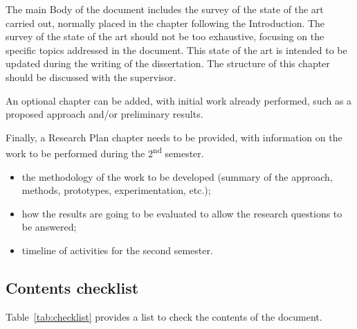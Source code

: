 The main Body of the document includes the survey of the state of the art carried out, normally placed in the chapter following the Introduction. The survey of the state of the art should not be too exhaustive, focusing on the specific topics addressed in the document. This state of the art is intended to be updated during the writing of the dissertation. The structure of this chapter should be discussed with the supervisor.

An optional chapter can be added, with initial work already performed, such as a proposed approach and/or preliminary results.

Finally, a Research Plan chapter needs to be provided, with information on the work to be performed during the 2\textsuperscript{nd} semester.

\begin{itemize}
  \item the methodology of the work to be developed (summary of the approach, methods, prototypes, experimentation, etc.);
  \item how the results are going to be evaluated to allow the research questions to be answered;
  \item timeline of activities for the second semester.
\end{itemize}

\subsection{Contents checklist}

Table~\ref{tab:checklist} provides a list to check the contents of the document.

